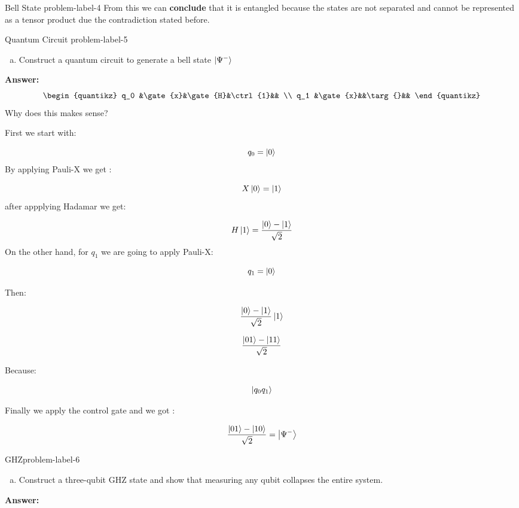 \begin{problem}{Bell State }{problem-label-4}
	From this we can \textbf{conclude} that it is entangled because the states are not separated and cannot be represented as a tensor product due the contradiction stated before.
\end{problem}

\begin{problem}{Quantum Circuit }{problem-label-5}
	
	\begin{enumerate}[(a)]
		\item Construct a quantum circuit to generate a bell state $\ket{\Psi^-}$
	\end{enumerate}
	\textbf{Answer:}\\
\[
	\begin{quantikz}
	q_0 &\gate{x}&\gate{H}&\ctrl{1}&& \\
	q_1 &\gate{x}&&\targ{}&&
\end{quantikz}
\]
Why does this makes sense?

First we start with:

\[
q_0 = \ket{0} 
\]
By applying Pauli-X we get :

\[
X\ket{0}=\ket{1}
\]
after appplying Hadamar we get:

\[
H\ket{1} = \frac{\ket{0}-\ket{1}}{\sqrt{2}}
\]
On the other hand, for $q_1$ we are going to apply Pauli-X:

\[
q_1 = \ket{0}
\]

Then:

\[
\frac{\ket{0}-\ket{1}}{\sqrt{2}} \ket{1}
\]

\[
\frac{\ket{01}-\ket{11}}{\sqrt{2}} 
\]

Because:

\[
\ket{q_0 q_1}
\]

Finally we apply the control gate and we got :

\[
\frac{\ket{01}-\ket{10}}{\sqrt{2}} = \ket{\Psi^-} 
\]
\end{problem}


\begin{problem}{GHZ}{problem-label-6}
	
	\begin{enumerate}[(a)]
		\item Construct a three-qubit GHZ state and show that measuring any qubit collapses the entire system.
	\end{enumerate}
	\textbf{Answer:}\\
	
	
\end{problem}

